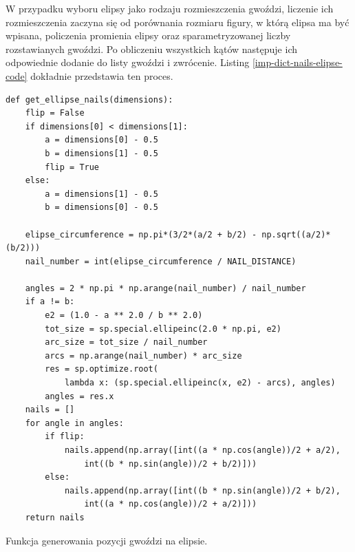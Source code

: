 \documentclass[a4paper, 12pt, polish, twoside]{extreport}
\begin{document}
        W przypadku wyboru elipsy jako rodzaju rozmieszczenia gwoździ, liczenie ich rozmieszczenia zaczyna się od porównania rozmiaru figury, w którą elipsa ma być wpisana, policzenia promienia elipsy oraz sparametryzowanej liczby rozstawianych gwoździ. Po obliczeniu wszystkich kątów następuje ich odpowiednie dodanie do listy gwoździ i zwrócenie. Listing \ref{imp-dict-nails-elipse-code} dokładnie przedstawia ten proces.
        \begin{code}[H]
        \begin{verbatim}
def get_ellipse_nails(dimensions):
    flip = False
    if dimensions[0] < dimensions[1]:
        a = dimensions[0] - 0.5
        b = dimensions[1] - 0.5
        flip = True
    else:
        a = dimensions[1] - 0.5
        b = dimensions[0] - 0.5

    elipse_circumference = np.pi*(3/2*(a/2 + b/2) - np.sqrt((a/2)*(b/2)))
    nail_number = int(elipse_circumference / NAIL_DISTANCE)

    angles = 2 * np.pi * np.arange(nail_number) / nail_number
    if a != b:
        e2 = (1.0 - a ** 2.0 / b ** 2.0)
        tot_size = sp.special.ellipeinc(2.0 * np.pi, e2)
        arc_size = tot_size / nail_number
        arcs = np.arange(nail_number) * arc_size
        res = sp.optimize.root(
            lambda x: (sp.special.ellipeinc(x, e2) - arcs), angles)
        angles = res.x 
    nails = []
    for angle in angles:
        if flip:
            nails.append(np.array([int((a * np.cos(angle))/2 + a/2), 
                int((b * np.sin(angle))/2 + b/2)]))
        else:
            nails.append(np.array([int((b * np.sin(angle))/2 + b/2), 
                int((a * np.cos(angle))/2 + a/2)]))
    return nails
        \end{verbatim}
        \caption{Funkcja generowania pozycji gwoździ na elipsie.}
        \label{imp-dict-nails-elipse-code}
        \end{code}
        
\end{document}
